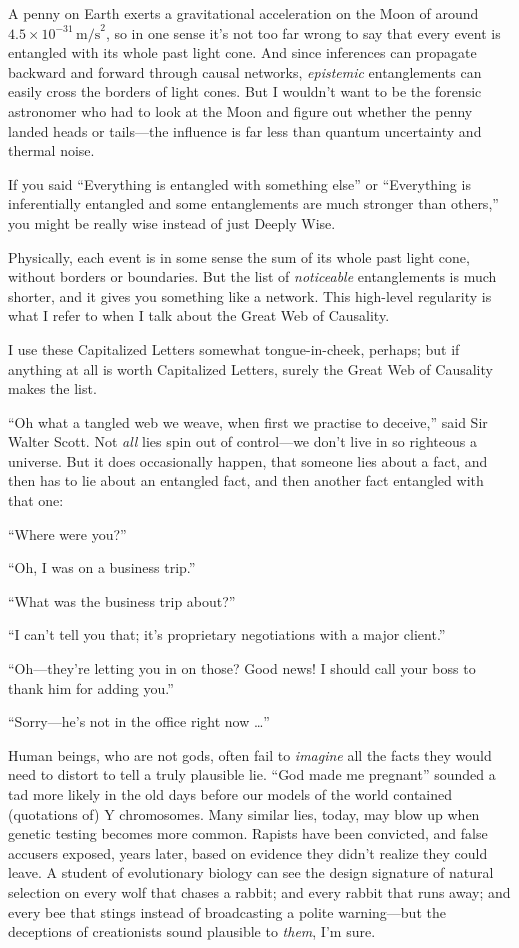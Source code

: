 {
 A penny on Earth exerts a gravitational acceleration on the Moon
of around $4.5 \times 10^{-31}\,
\mathrm{m/s}^{2}$, so in one sense it's not too
far wrong to say that every event is entangled with its whole past
light cone. And since inferences can propagate backward and forward
through causal networks, \textit{epistemic} entanglements can easily
cross the borders of light cones. But I wouldn't want
to be the forensic astronomer who had to look at the Moon and figure
out whether the penny landed heads or tails---the influence is far less
than quantum uncertainty and thermal noise.}

{
 If you said ``Everything is entangled with
something else'' or ``Everything is
inferentially entangled and some entanglements are much stronger than
others,'' you might be really wise instead of just
Deeply Wise.}

{
 Physically, each event is in some sense the sum of its whole past
light cone, without borders or boundaries. But the list of
\textit{noticeable} entanglements is much shorter, and it gives you
something like a network. This high-level regularity is what I refer to
when I talk about the Great Web of Causality.}

{
 I use these Capitalized Letters somewhat tongue-in-cheek, perhaps;
but if anything at all is worth Capitalized Letters, surely the Great
Web of Causality makes the list.}

{
 ``Oh what a tangled web we weave, when first we
practise to deceive,'' said Sir Walter Scott. Not
\textit{all} lies spin out of control---we don't live
in so righteous a universe. But it does occasionally happen, that
someone lies about a fact, and then has to lie about an entangled fact,
and then another fact entangled with that one:}

{
 ``Where were you?''}

{
 ``Oh, I was on a business
trip.''}

{
 ``What was the business trip
about?''}

{
 ``I can't tell you that;
it's proprietary negotiations with a major
client.''}

{
 ``Oh---they're letting you in on
those? Good news! I should call your boss to thank him for adding
you.''}

{
 ``Sorry---he's not in the office
right now \ldots''}

{
 Human beings, who are not gods, often fail to \textit{imagine} all
the facts they would need to distort to tell a truly plausible lie.
``God made me pregnant'' sounded a
tad more likely in the old days before our models of the world
contained (quotations of) Y chromosomes. Many similar lies, today, may
blow up when genetic testing becomes more common. Rapists have been
convicted, and false accusers exposed, years later, based on evidence
they didn't realize they could leave. A student of
evolutionary biology can see the design signature of natural selection
on every wolf that chases a rabbit; and every rabbit that runs away;
and every bee that stings instead of broadcasting a polite
warning---but the deceptions of creationists sound plausible to
\textit{them}, I'm sure.}

